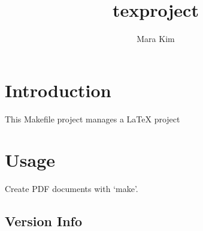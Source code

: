 \documentclass{article}
\author{Mara Kim}
\title{texproject}
\begin{document}
\maketitle
\tableofcontents
\section{Introduction}
This Makefile project manages a \LaTeX{} project
\section{Usage}
Create PDF documents with `make'.
\\
\subsection*{Version Info}
\scriptsize{ }
\end{document}
